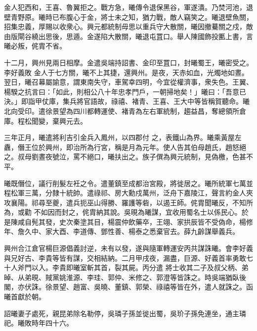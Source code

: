 \begin{pinyinscope}
 金人犯西和，王喜、魯翼拒之。戰方急，曦傳令退保黑谷，軍遂潰。乃焚河池，退壁青野原。曦時已布腹心于金，將士未之知，猶力戰，敵人竊笑之。曦退壁魚關，招集忠義，厚賜以收衆心。興元都統制毋思以重兵守大散關，曦因撤驀關之戍，敵由版閘谷繞出思後，思遁。金遂陷大散關，曦退屯罝口。舉人陳國飾投匭上書，言曦必叛，侂胄不省。



 十二月，興州見兩日相摩。金遣吳端持詔書、金印至罝口，封曦蜀王，曦密受之。李好義敗
 金人于七方關，曦不上其捷，還興州。是夜，天赤如血，光燭地如晝。翌日，曦召幕屬諭意，謂東南失守，車駕幸四明，今宜從權濟事，衆失色。王翼、楊騤之抗言曰：「如此，則相公八十年忠孝門戶，一朝掃地矣！」曦曰：「吾意已決。」即詣甲仗庫，集兵將官語故，祿禧、褚青、王喜、王大中等皆稱賀聽命。曦北向受印。遣徐景望為四川都轉運使、褚青為左右軍統制，趨益昌，奪總領所倉庫。程松聞變，棄興元去。



 三年正月，曦遣將利吉引金兵入鳳州，以四郡付
 之，表鐵山為界。曦乘黃屋左纛，僭王位於興州，即治所為行宮，稱是月為元年。使人告其伯母趙氏，趙怒絕之。叔母劉晝夜號泣，罵不絕口，曦扶出之。族子僎為興元統制，見偽檄，色甚不平。



 曦既僭位，議行削髮左衽之令。遣董鎮至成都治宮殿，將徙居之。曦所統軍七萬並程松軍三萬，分隸十統帥。遣祿祁、房大勳戍萬州，泛舟下嘉陵江，聲言約金人夾攻襄陽。祁尋至夔，遣兵扼巫山得勝、羅護等砦，以遏王師。侂胄聞曦反，不知所為，或勸
 不如因而封之，侂胄納其說。吳晛為曦謀，宜收用蜀名士以係民心。於是陳咸自髡其發，史次秦塗其目，楊震仲飲藥卒，王翊、家拱辰皆不受偽命，楊修年、詹久中、家大酉、李道傳、鄧性善、楊泰之悉棄官去。薛九齡謀舉義兵。



 興州合江倉官楊巨源倡義討逆，未有以發，遂與隨軍轉運安丙共謀誅曦。會李好義與兄好古、李貴等皆有謀，交相結納。二月甲戌夜，漏盡，巨源、好義首率勇敢七十人斧門以入。李貴即曦室斬其首，裂其屍。丙分遣
 將士收其二子及叔父柄、弟晫、从弟晛、賊黨姚淮源、李珪、郭仲、米修之、郭澄等皆誅之。時吳端猶臥後閣，亦伏誅。徐景望、趙富、吳曉、董鎮、郭榮、祿禧等皆在外，遣人就誅之。函曦首獻於朝。



 詔曦妻子處死，親昆弟除名勒停，吳璘子孫並徙出蜀，吳玠子孫免連坐，通主璘祀。曦敗時年四十六。



\end{pinyinscope}